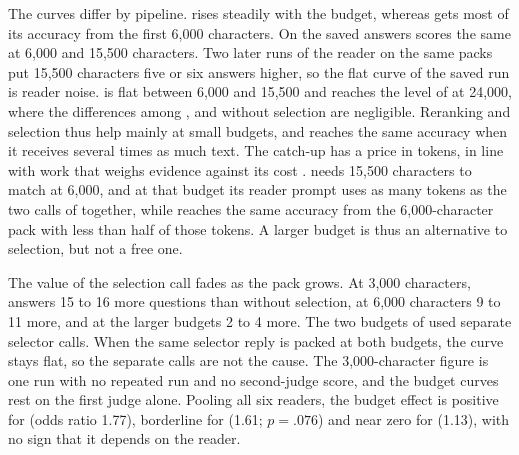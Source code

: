 The curves differ by pipeline. \hybrid{} rises steadily with the budget, whereas \hr{} gets most of its accuracy from the first 6,000 characters. On the saved answers \hr{} scores the same at 6,000 and 15,500 characters. Two later runs of the reader on the same packs put 15,500 characters five or six answers higher, so the flat curve of the saved run is reader noise. \lexb{} is flat between 6,000 and 15,500 and reaches the level of \hybrid{} at 24,000, where the differences among \hybrid{}, \lexb{} and \lexb{} without selection are negligible. Reranking and selection thus help mainly at small budgets, and \hybrid{} reaches the same accuracy when it receives several times as much text. The catch-up has a price in tokens, in line with work that weighs evidence against its cost \citep{wu2026costaware,sharify2026rerank}. \hybrid{} needs 15,500 characters to match \lexb{} at 6,000, and at that budget its reader prompt uses as many tokens as the two calls of \lexb{} together, while \hr{} reaches the same accuracy from the 6,000-character pack with less than half of those tokens. A larger budget is thus an alternative to selection, but not a free one.

The value of the selection call fades as the pack grows. At 3,000 characters, \lexb{} answers 15 to 16 more questions than \lexb{} without selection, at 6,000 characters 9 to 11 more, and at the larger budgets 2 to 4 more. The two budgets of \lexb{} used separate selector calls. When the same selector reply is packed at both budgets, the curve stays flat, so the separate calls are not the cause. The 3,000-character figure is one run with no repeated run and no second-judge score, and the budget curves rest on the first judge alone. Pooling all six readers, the budget effect is positive for \hybrid{} (odds ratio 1.77), borderline for \hr{} (1.61; $p=.076$) and near zero for \lexb{} (1.13), with no sign that it depends on the reader.

